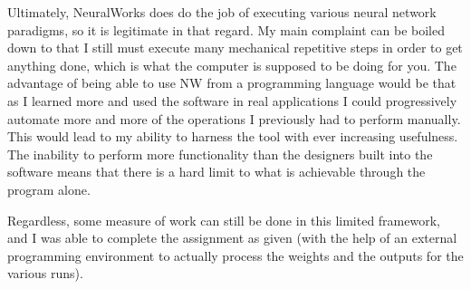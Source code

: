 \documentclass[12pt]{article}
\begin{document}
Ultimately, NeuralWorks does do the job of executing various neural network paradigms, so it is legitimate in that regard.  My main complaint can be boiled down to that I still must execute many mechanical repetitive steps in order to get anything done, which is what the computer is supposed to be doing for you.  The advantage of being able to use NW from a programming language would be that as I learned more and used the software in real applications I could progressively automate more and more of the operations I previously had to perform manually.  This would lead to my ability to harness the tool with ever increasing usefulness.  The inability to perform more functionality than the designers built into the software means that there is a hard limit to what is achievable through the program alone.  

Regardless, some measure of work can still be done in this limited framework, and I was able to complete the assignment as given (with the help of an external programming environment to actually process the weights and the outputs for the various runs).  
\end{document}

